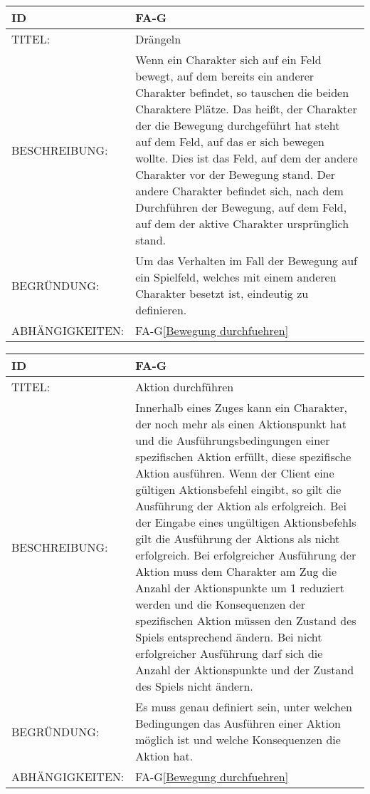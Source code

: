 \begin{tabularx}{16cm}{l|X}
	{table}\label{Draengeln}
	\textbf{ID} & \textbf{FA-G\arabic{table}} \\
	\hline
	TITEL: & Drängeln \\
	\hline
	BESCHREIBUNG: & Wenn ein Charakter sich auf ein Feld bewegt, auf dem bereits ein anderer Charakter 		befindet, so tauschen die beiden Charaktere Plätze. Das heißt, der Charakter der die Bewegung durchgeführt hat steht auf dem Feld, auf das er sich bewegen wollte. Dies ist das Feld, auf dem der andere Charakter vor der Bewegung stand. Der andere Charakter befindet sich, nach dem Durchführen der Bewegung, auf dem Feld, auf dem der aktive Charakter ursprünglich stand. \\
	\hline
	BEGRÜNDUNG: & Um das Verhalten im Fall der Bewegung auf ein Spielfeld, welches mit einem anderen 			Charakter besetzt ist, eindeutig zu definieren.\\
	\hline
	ABHÄNGIGKEITEN: & FA-G\ref{Bewegung durchfuehren} \todo[inline]{2.8.1 Wahlphase}\\
\end{tabularx}

\begin{tabularx}{16cm}{l|X}
	{table}\label{Aktion durchfuehren}
	\textbf{ID} & \textbf{FA-G\arabic{table}} \\
	\hline
	TITEL: & Aktion durchführen \\
	\hline
	BESCHREIBUNG: & Innerhalb eines Zuges kann ein Charakter, der noch mehr als einen Aktionspunkt hat und die Ausführungsbedingungen einer spezifischen Aktion erfüllt, diese spezifische Aktion ausführen.
	 Wenn der Client eine gültigen Aktionsbefehl eingibt, so gilt die Ausführung der Aktion als erfolgreich. Bei der Eingabe eines ungültigen Aktionsbefehls gilt die Ausführung der Aktions als nicht erfolgreich.
	 Bei erfolgreicher Ausführung der Aktion muss dem Charakter am Zug die Anzahl der Aktionspunkte um 1 reduziert werden und die Konsequenzen der spezifischen Aktion müssen den Zustand des Spiels entsprechend ändern. Bei nicht erfolgreicher Ausführung darf sich die Anzahl der Aktionspunkte und der Zustand des Spiels nicht ändern.  \\
	\hline
	BEGRÜNDUNG: & Es muss genau definiert sein, unter welchen Bedingungen das Ausführen einer Aktion möglich ist und welche Konsequenzen die Aktion hat.\\
	\hline
	ABHÄNGIGKEITEN: & FA-G\ref{Bewegung durchfuehren} \todo[inline]{2.8.1 Wahlphase}\\
\end{tabularx}


